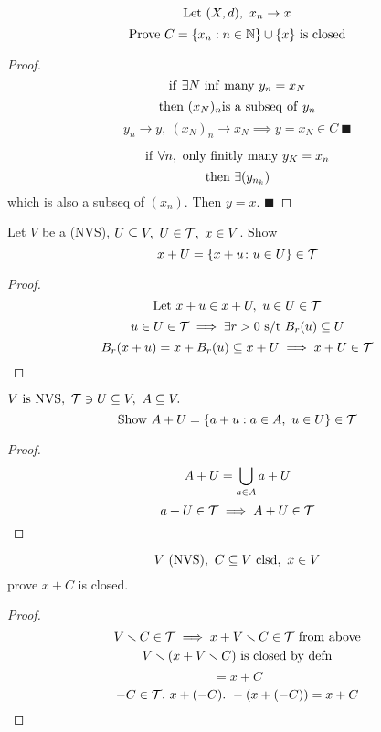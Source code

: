 \documentclass[12pt]{article}
\begin{document}
\bboxexam
\begin{exam}
    \[
        \mathrm{Let}\ (X,d),\ x_n\to x
    \]
    \[
        \mathrm{Prove}\
        C=\{x_n:n\in\mathbb N\}\cup\{x\}\ \mathrm{is}\ \mathrm{closed}
    \]
    \bboxproof
    \begin{proof}
        \[
            \iif\ \exists N\ \TR{inf\ many}\ y_n=x_N
        \]
        \[
            \tthen\ (x_N)_n\is\ \TR{a\ subseq\ of}\ y_n
        \]
        \[
            y_n\to y,\ (x_N)_n\to x_N\implies y=x_N\in C\ \blacksquare
        \]


        \[
            \iif\ \forall n,\ \TR{only\ finitly\ many}\ y_K=x_n
        \]
        \[
            \tthen\ \exists(y_{n_k})
        \]
        which is also a subseq of \((x_n)\). Then \(y=x\). \(\blacksquare\)
    \end{proof}
    \ebox
\end{exam}
\ebox


\bboxexam
\begin{exam}
    Let \(V\) be a (NVS), \(U\subseteq V,\ U\in\mathcal T,\ x\in V\). Show
    \[
        x+U=\{x+u\colon u\in U\}\in\mathcal T
    \]

    \bboxproof
    \begin{proof}
        \[
            \mathrm{Let}\ x+u\in x+U,\ u\in U\in\mathcal T
        \]
        \[
            u\in U\in\mathcal T\implies \exists r>0\text{ s/t }
            B_r(u)\subseteq U
        \]
        \[
            B_r(x+u)=x+B_r(u)\subseteq x+U\implies x+U\in\mathcal T
        \]
    \end{proof}
    \ebox
\end{exam}
\ebox

\bboxexam
\begin{exam}
    \(V\ \mathrm{is}\ \mathrm{NVS},\ \mathcal T\ni U\subseteq V,\ A\subseteq V.\)
    \[
        \TR{Show}\ A+U=\{a+u:a\in A,\ u\in U\}\in\TT
    \]
    \bboxproof
    \begin{proof}
        \[
            A+U=\bigcup_{a\in A}a+U
        \]
        \[
            a+U\in\mathcal T\implies A+U\in\mathcal T
        \]
    \end{proof}
    \ebox
\end{exam}
\ebox



\bboxexam
\begin{exam}
    \[
        V\ (\mathrm{NVS}),\ C\subseteq V\ \mathrm{clsd},\ x\in V
    \]
    prove \(x+C\) is closed.
    \bboxproof
    \begin{proof}
        \[
            V\smallsetminus C\in\mathcal T\implies x + V\smallsetminus C\in\mathcal T\ \mathrm{from\ above}
        \]
        \[
            V\smin(x+V\smin C)\ \TR{is\ closed\ by\ defn}
        \]
        \[
            =x+C
        \]
        \[
            -C\in\TT.\ x+(-C).\ -(x+(-C))=x+C
        \]
    \end{proof}
    \ebox

\end{exam}
\ebox
\end{document}
